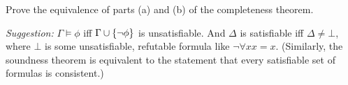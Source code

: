 \begin{problem}[2]
  Prove the equivalence of parts (a) and (b) of the completeness theorem.

  \step
  \emph{Suggestion: } $\Gamma \models \phi$ iff $\Gamma \cup \left\{\lnot \phi\right\}$
    is unsatisfiable. And $\Delta$ is satisfiable iff $\Delta \ne \bot$,
    where $\bot$ is some unsatisfiable, refutable formula
    like $\lnot \forall x x = x$.
    (Similarly, the soundness theorem is equivalent to the statement
    that every satisfiable set of formulas is consistent.)
\end{problem}

\begin{Answer}

\end{Answer}
